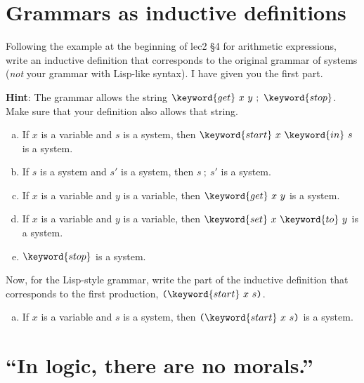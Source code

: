 \section{Grammars as inductive definitions}

Following the example at the beginning of lec2 \S4 for arithmetic expressions, 
write an inductive definition that corresponds to the original grammar of systems
(\emph{not} your grammar with Lisp-like syntax).
I have given you the first part.

\textbf{Hint}: The grammar allows the string $\keyword{get}~x~y~;~\keyword{stop}$.
Make sure that your definition also allows that string.

\begin{enumerate}[(a)]
\item If $x$ is a variable and $s$ is a system,
  then $\keyword{start}~x~\keyword{in}~s$
  is a system.\vspace{-0.6ex}
\item If $s$ is a system and $s'$ is a system,
  then $s~;~s'$
  is a system.\vspace{-0.6ex}
\item If $x$ is a variable and $y$ is a variable,
  then $\keyword{get}~x~y$
  is a system.\vspace{-0.6ex}
\item If $x$ is a variable and $y$ is a variable,
  then $\keyword{set}~x~\keyword{to}~y$
  is a system.\vspace{-0.6ex}
\item $\keyword{stop}$ is a system.
\vspace{6ex}
\end{enumerate}
\vspace{6ex}



Now, for the Lisp-style grammar, write the part of the inductive definition that
corresponds to the first production, $\texttt(\keyword{start}~x~s\texttt)$.

\begin{enumerate}[(a)]
\item If $x$ is a variable and $s$ is a system, then $\texttt{(}\keyword{start}~x~s\texttt{)}$ is a system.
\end{enumerate}
 \vspace{6ex}


\clearpage
\section{``In logic, there are no morals.''}
\newcommand{\downodd}{\down_\textsf{\upshape\selectfont odd}}
\newcommand{\odddown}{\mathrel{{}_\textsf{\upshape\selectfont odd}{\down}}} %

